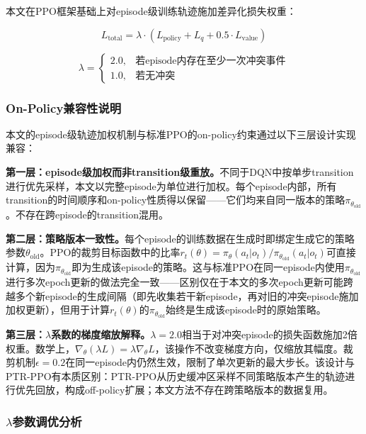 \documentclass[12pt,a4paper,UTF8]{ctexart}
\begin{document}
本文在PPO框架基础上对episode级训练轨迹施加差异化损失权重：

\begin{equation}
    L_{\text{total}} = \lambda \cdot \left(L_{\text{policy}} + L_{q} + 0.5 \cdot L_{\text{value}}\right)
\end{equation}

\begin{equation}
    \lambda = \begin{cases}
        2.0, & \text{若episode内存在至少一次冲突事件} \\
        1.0, & \text{若无冲突}
    \end{cases}
\end{equation}

\subsubsection{On-Policy兼容性说明}

本文的episode级轨迹加权机制与标准PPO的on-policy约束通过以下三层设计实现兼容：

\textbf{第一层：episode级加权而非transition级重放。}不同于DQN中按单步transition进行优先采样，本文以完整episode为单位进行加权。每个episode内部，所有transition的时间顺序和on-policy性质得以保留——它们均来自同一版本的策略$\pi_{\theta_{\text{old}}}$。不存在跨episode的transition混用。

\textbf{第二层：策略版本一致性。}每个episode的训练数据在生成时即绑定生成它的策略参数$\theta_{\text{old}}$。PPO的裁剪目标函数中的比率$r_t(\theta) = \pi_\theta(a_t|o_t)/\pi_{\theta_{\text{old}}}(a_t|o_t)$可直接计算，因为$\pi_{\theta_{\text{old}}}$即为生成该episode的策略。这与标准PPO在同一episode内使用$\pi_{\theta_{\text{old}}}$进行多次epoch更新的做法完全一致——区别仅在于本文的多次epoch更新可能跨越多个新episode的生成间隔（即先收集若干新episode，再对旧的冲突episode施加加权更新），但用于计算$r_t(\theta)$的$\pi_{\theta_{\text{old}}}$始终是生成该episode时的原始策略。

\textbf{第三层：$\lambda$系数的梯度缩放解释。}$\lambda=2.0$相当于对冲突episode的损失函数施加2倍权重。数学上，$\nabla_\theta (\lambda L) = \lambda \nabla_\theta L$，该操作不改变梯度方向，仅缩放其幅度。裁剪机制$\epsilon=0.2$在同一episode内仍然生效，限制了单次更新的最大步长。该设计与PTR-PPO\cite{ref21}有本质区别：PTR-PPO从历史缓冲区采样不同策略版本产生的轨迹进行优先回放，构成off-policy扩展；本文方法不存在跨策略版本的数据复用。

\subsubsection{$\lambda$参数调优分析}
\end{document}
